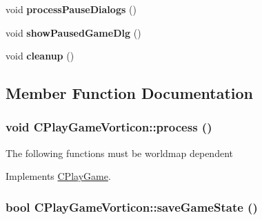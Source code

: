 \begin{DoxyCompactItemize}
\item 
\hypertarget{class_c_play_game_vorticon_a8235e4760302509ac5bcd69a6fa42e92}{
void {\bfseries processPauseDialogs} ()}
\label{class_c_play_game_vorticon_a8235e4760302509ac5bcd69a6fa42e92}

\item 
\hypertarget{class_c_play_game_vorticon_a3762358b800c885fe3727764e813a1c8}{
void {\bfseries showPausedGameDlg} ()}
\label{class_c_play_game_vorticon_a3762358b800c885fe3727764e813a1c8}

\item 
\hypertarget{class_c_play_game_vorticon_a0ffc72abf2f67d53beb975c13579ebcc}{
void {\bfseries cleanup} ()}
\label{class_c_play_game_vorticon_a0ffc72abf2f67d53beb975c13579ebcc}

\end{DoxyCompactItemize}


\subsection{Member Function Documentation}
\hypertarget{class_c_play_game_vorticon_aeda795f9cee02c61b274b4dd562c8b0f}{
\subsubsection[{process}]{\setlength{\rightskip}{0pt plus 5cm}void CPlayGameVorticon::process ()}}
\label{class_c_play_game_vorticon_aeda795f9cee02c61b274b4dd562c8b0f}


The following functions must be worldmap dependent 



Implements \hyperlink{class_c_play_game}{CPlayGame}.

\hypertarget{class_c_play_game_vorticon_a092f1468065b0aa10759ce75f3367275}{
\subsubsection[{saveGameState}]{\setlength{\rightskip}{0pt plus 5cm}bool CPlayGameVorticon::saveGameState ()}}
\label{class_c_play_game_vorticon_a092f1468065b0aa10759ce75f3367275}


